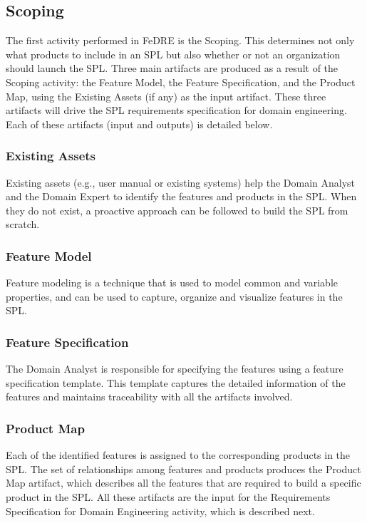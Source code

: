 \subsection{Scoping}

The first activity performed in \ac{FeDRE} is the Scoping. This determines not only
what products to include in an \ac{SPL} but also whether or not an organization should 
launch the \ac{SPL}. Three main artifacts are produced as a result of the Scoping activity: 
the Feature Model, the Feature Specification, and the Product Map, using the Existing 
Assets (if any) as the input artifact. These three artifacts will drive the \ac{SPL} requirements 
specification for domain engineering. Each of these artifacts (input and outputs) is 
detailed below.

\subsubsection{Existing Assets}

Existing assets (e.g., user manual or existing systems) help the Domain Analyst
and the Domain Expert to identify the features and products in the \ac{SPL}. When they do not 
exist, a proactive approach can be followed to build the \ac{SPL} from scratch.

\subsubsection{Feature Model}

Feature modeling is a technique that is used to model common and variable
properties, and can be used to capture, organize and visualize features in the \ac{SPL}.

\subsubsection{Feature Specification}

The Domain Analyst is responsible for specifying the features using a feature
specification template. This template captures the detailed information of the
features and maintains traceability with all the artifacts involved.

\subsubsection{Product Map}

Each of the identified features is assigned to the corresponding products in the \ac{SPL}. 
The set of relationships among features and products produces the Product Map artifact, 
which describes all the features that are required to build a specific product in the \ac{SPL}.
All these artifacts are the input for the Requirements Specification for Domain Engineering 
activity, which is described next.

